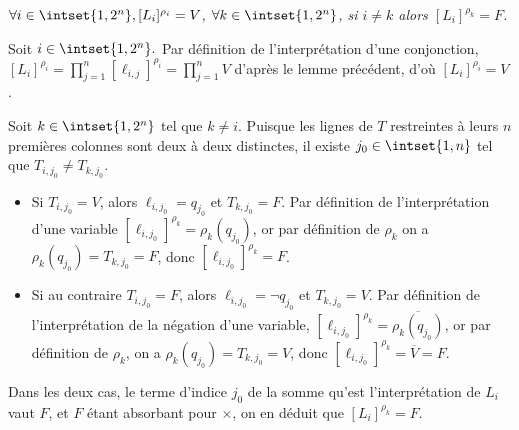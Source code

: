 \documentclass{scrartcl}
\begin{document}

				\lemma \textsl{$\forall i \in \intset{1,2^n}, [L_i]^{\rho_i} = V$, $\forall k \in \intset{1,2^n}$, si $i\neq k$ alors $[L_i]^{\rho_k} = F$.}
				\begin{demo}
					\item Soit $i \in \intset{1,2^n}.$ Par définition de l'interprétation d'une conjonction, 
					$[L_i]^{\rho_i} = \prod\limits_{j=1}^n [\ell_{i,j}]^{\rho_i} = \prod\limits_{j=1}^n V$ d'après le lemme précédent, d'où $[L_i]^{\rho_i} = V$.
					\item Soit $k \in \intset{1,2^n}$ tel que $k \neq i$. 
					Puisque les lignes de $T$ restreintes à leurs $n$ premières colonnes sont deux à deux distinctes, il existe $j_0 \in \intset{1,n}$ tel que $T_{i,j_0} \neq T_{k,j_0}$.
					\begin{itemize}
						\item Si $T_{i,j_0} = V$, alors $\ell_{i,j_0} = q_{j_0}$ et $T_{k,j_0} = F$. 
						Par définition de l'interprétation d'une variable $[\ell_{i,j_0}]^{\rho_k} = \rho_k(q_{j_0})$,
						or par définition de $\rho_k$ on a $\rho_k(q_{j_0}) = T_{k,j_0} = F$, donc $[\ell_{i,j_0}]^{\rho_k} = F$.
						\item Si au contraire $T_{i,j_0} = F$, alors $\ell_{i,j_0} = \neg q_{j_0}$ et $T_{k,j_0} = V$.
						Par définition de l'interprétation de la négation d'une variable,
						$[\ell_{i,j_0}]^{\rho_k} = \overline{\rho_k(q_{j_0})}$, or par définition de $\rho_k$, on a $\rho_k(q_{j_0}) = T_{k,j_0} = V$, 
						donc $[\ell_{i,j_0}]^{\rho_k} = \overline{V} = F$.
					\end{itemize}
					\item Dans les deux cas, le terme d'indice $j_0$ de la somme qu'est l'interprétation de $L_i$ vaut $F$, et $F$ étant absorbant pour $\times$, on en déduit que
					$[L_i]^{\rho_k} = F$.
				\end{demo}
				\vspace{10pt}

\end{document}
